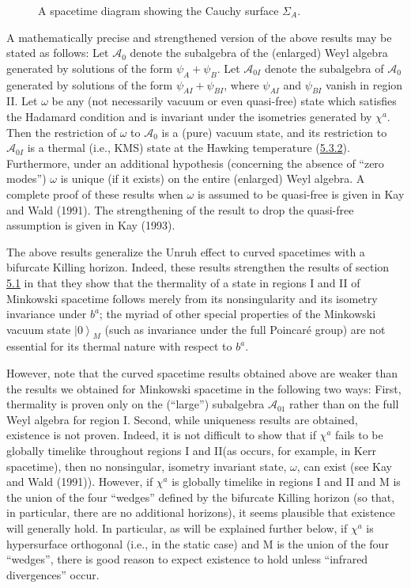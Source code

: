 \documentclass[11pt,a4paper]{article}
\providecommand{\ket}[1]{\left\lvert#1\right\rangle}
\begin{document}
\begin{figure}[htbp]
\centering
\renewcommand{\thefigure}{5.2}

\caption{A spacetime diagram showing the Cauchy surface \(\Sigma_A\).}\label{fig:5.2}
\end{figure}

A mathematically precise and strengthened version of the above results may be stated as follows: Let \(\mathcal{A}_0\) denote the subalgebra of the (enlarged) Weyl algebra generated by solutions of the form \(\psi_A + \psi_B\). Let \(\mathcal{A}_{0I}\) denote the subalgebra of \(\mathcal{A}_0\) generated by solutions of the form \(\psi_{AI} + \psi_{BI}\), where \(\psi_{AI}\) and \(\psi_{BI}\) vanish in region II. Let \(\omega\) be any (not necessarily vacuum or even quasi-free) state which satisfies the Hadamard condition and is invariant under the isometries generated by \(\chi^a\). Then the restriction of \(\omega\) to \(\mathcal{A}_0\) is a (pure) vacuum state, and its restriction to \(\mathcal{A}_{0I}\) is a thermal (i.e., KMS) state at the Hawking temperature (\hyperref[eq:5.3.2]{5.3.2}). Furthermore, under an additional hypothesis (concerning the absence of ``zero modes'') \(\omega\) is unique (if it exists) on the entire (enlarged) Weyl algebra. A complete proof of these results when \(\omega\) is assumed to be quasi-free is given in Kay and Wald (1991). The strengthening of the result to drop the quasi-free assumption is given in Kay (1993).

The above results generalize the Unruh effect to curved spacetimes with a bifurcate Killing horizon. Indeed, these results strengthen the results of section \hyperlink{sec:5.1}{5.1} in that they show that the \hypertarget{source-140}{} thermality of a state in regions I and II of Minkowski spacetime follows merely from its nonsingularity and its isometry invariance under \(b^a\); the myriad of other special properties of the Minkowski vacuum state \(\ket{0}_M\) (such as invariance under the full Poincaré group) are not essential for its thermal nature with respect to \(b^a\).

However, note that the curved spacetime results obtained above are weaker than the results we obtained for Minkowski spacetime in the following two ways: First, thermality is proven only on the (``large'') subalgebra \(\mathcal{A}_{01}\) rather than on the full Weyl algebra for region I. Second, while uniqueness results are obtained, existence is not proven. Indeed, it is not difficult to show that if \(\chi^a\) fails to be globally timelike throughout regions I and II(as occurs, for example, in Kerr spacetime), then no nonsingular, isometry invariant state, \(\omega\), can exist (see Kay and Wald (1991)). However, if \(\chi^a\) is globally timelike in regions I and II and M is the union of the four ``wedges'' defined by the bifurcate Killing horizon (so that, in particular, there are no additional horizons), it seems plausible that existence will generally hold. In particular, as will be explained further below, if \(\chi^a\) is hypersurface orthogonal (i.e., in the static case) and M is the union of the four ``wedges'', there is good reason to expect existence to hold unless ``infrared divergences'' occur.
\end{document}
